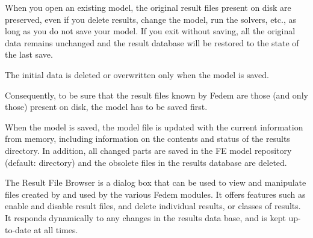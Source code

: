 
When you open an existing model, the original result files present on disk are
preserved, even if you delete results, change the model, run the solvers, etc.,
as long as you do not save your model. If you exit without saving,
all the original data remains unchanged and the result database will be restored
to the state of the last save.

The initial data is deleted or overwritten only when the model is saved.

Consequently, to be sure that the result files known by Fedem are those
(and only those) present on disk, the model has to be saved first.




When the model is saved, the model file is updated with the current information
from memory, including information on the contents and status of the results
directory. In addition, all changed parts are saved in the FE model repository
(default:  directory) and the obsolete files in the results
database are deleted.



The Result File Browser is a dialog box that can be used to view and
manipulate files created by and used by the various Fedem modules.
It offers features such as enable and disable result files, and delete
individual results, or classes of results. It responds dynamically to
any changes in the results data base, and is kept up-to-date at all times.




